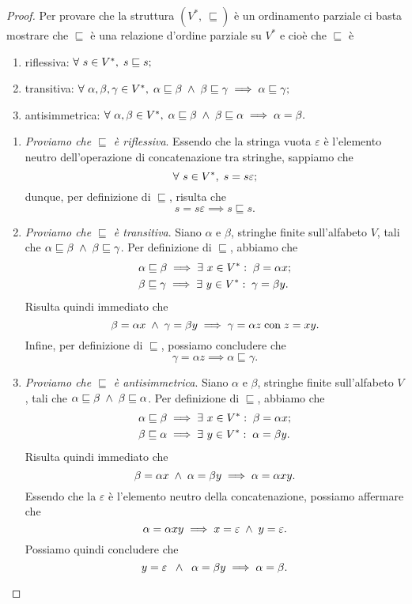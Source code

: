 \begin{proof}
Per provare che la struttura $(V^*,\ \sqsubseteq )$ è un ordinamento parziale ci basta mostrare che $\sqsubseteq$ è una relazione d'ordine parziale su $V^*$ e cioè che $\sqsubseteq$ è 
\begin{enumerate}
\item riflessiva: 
	$\forall \ s \in V^* ,\; s \sqsubseteq s;$ 
\item transitiva: 
	$\forall \ \alpha, \beta, \gamma \in V^* ,\; 
		\alpha \sqsubseteq \beta \; \land \; \beta \sqsubseteq \gamma 
		\implies \alpha \sqsubseteq \gamma;$ 
\item antisimmetrica: 
	$\forall \ \alpha, \beta \in V^* ,\;
		\alpha \sqsubseteq \beta \; \land \; \beta \sqsubseteq \alpha
		\implies \alpha = \beta.$
\end{enumerate}
\begin{enumerate}[leftmargin=*]
\item \textit{Proviamo che $\sqsubseteq$ è riflessiva}. Essendo che la stringa vuota $\varepsilon$ è l'elemento neutro dell'operazione di concatenazione tra stringhe, sappiamo che \[
	\forall \ s \in V^* ,\; s = s \varepsilon;
\]
dunque, per definizione di $\sqsubseteq$, risulta che \[
	s = s \varepsilon \implies s \sqsubseteq s.
\]
\item \textit{Proviamo che $\sqsubseteq$ è transitiva}. Siano $\alpha$ e $\beta$, stringhe finite sull'alfabeto $V$, tali che $\alpha \sqsubseteq \beta \; \land \; \beta \sqsubseteq \gamma$. 
Per definizione di $\sqsubseteq$, abbiamo che
\begin{align*}
	& \alpha \sqsubseteq \beta \implies \exists \ x \in V^* :\; \beta = \alpha x;\\
	& \beta \sqsubseteq \gamma \implies \exists \ y \in V^* :\; \gamma = \beta y.
\end{align*} 
Risulta quindi immediato che \[
	\beta = \alpha x \; \land \; \gamma = \beta y \implies \gamma = \alpha z \; \text{con} \; z = xy.
\]
Infine, per definizione di $\sqsubseteq$, possiamo concludere che \[
	\gamma = \alpha z \implies \alpha \sqsubseteq \gamma.
\]
\item \textit{Proviamo che $\sqsubseteq$ è antisimmetrica}. Siano $\alpha$ e $\beta$, stringhe finite sull'alfabeto $V$, tali che $\alpha \sqsubseteq \beta \; \land \; \beta \sqsubseteq \alpha$.
Per definizione di $\sqsubseteq$, abbiamo che
\begin{align*}
	& \alpha \sqsubseteq \beta \implies \exists \ x \in V^* :\; \beta = \alpha x;\\
	& \beta \sqsubseteq \alpha \implies \exists \ y \in V^* :\; \alpha = \beta y.
\end{align*} 
Risulta quindi immediato che \[
	\beta = \alpha x \; \land \; \alpha = \beta y \implies \alpha = \alpha xy.
\]
Essendo che la $\varepsilon$ è l'elemento neutro della concatenazione, possiamo affermare che \[
	\alpha = \alpha xy \implies x = \varepsilon \; \land \; y = \varepsilon.
\]
Possiamo quindi concludere che \[
	y = \varepsilon \; \; \land \; \; \alpha = \beta y \implies \alpha = \beta.
\]
\end{enumerate}
\end{proof}


